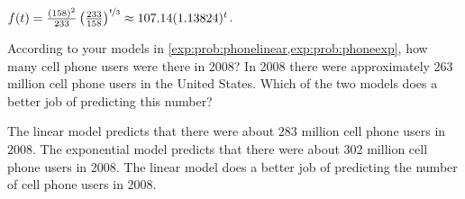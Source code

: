 \begin{problem}
\begin{subproblem}
	\begin{shortsolution}
		$f(t)=\frac{(158)^2}{233}\left(\frac{233}{158}\right)^{\nicefrac{t}{3}}\approx107.14(1.13824)^t$.
	\end{shortsolution}
\end{subproblem}
\begin{subproblem}
	According to your models in \cref{exp:prob:phonelinear,exp:prob:phoneexp}, how many cell phone users were there in 2008?
	In 2008 there were approximately 263 million cell phone users in the United States. Which of the two models 
	does a better job of predicting this number?
	\begin{shortsolution}
		The linear model predicts that there were about 283 million cell phone users in 2008.  
		The exponential model predicts that there were about 302 million cell phone users in 2008. The linear model 
		does a better job of predicting the number of cell phone users in 2008.
	\end{shortsolution}
\end{subproblem}
\end{problem}
			
